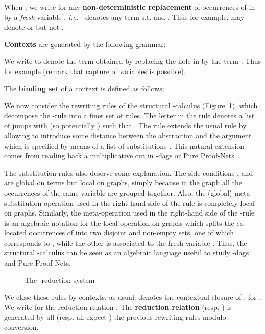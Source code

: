 \documentclass{LMCS}
\newcommand{\ie}{{\it  i.e.}~}
\renewcommand{\>}{\rightarrow}
\newcommand{\deft}[1]{{\bf #1}}
\begin{document}
When , we write  for any
\deft{non-deterministic replacement} of 
occurrences of  in  by a {\it fresh} variable , \ie\
 denotes  any term  s.t. 
 and . 
 Thus for
example,  may denote  or
 but not .

\deft{Contexts} are generated by the following grammar:

We write  to denote the term obtained by replacing the
hole  in  by the term . Thus for example  
 (remark that 
capture of variables is possible).

The  \deft{binding set} of a context 
is defined as follows: 
 


We now consider the
rewriting rules of the structural -calculus
(Figure~\ref{f:lambdaj}), which decompose the -rule into a
finer set of rules. The letter  in the rule 
  denotes a list  of jumps with
   (so potentially ) such that .  The  rule extends the usual  rule
   by allowing to introduce some
  distance between the abstraction  and the argument 
  which is specified by means of a list of substitutions
  . This natural extension comes from reading back a
  multiplicative cut in -dags or Pure
  Proof-Nets~\cite{AG09,AccattoliTh}.

The substitution
  rules also deserve some explanation. The side conditions ,
   and  are global on terms but local on graphs,
  simply because in the graph all the occurrences of the same variable are grouped
  together.  Also, the (global) meta-substitution
  operation  used in the right-hand side of the rule
   is completely local on graphs. Similarly, the meta-operation
   used in the right-hand side of the -rule is an
  algebraic notation for the local operation on graphs which splits  the co-located
  occurrences of  into two disjoint and
  non-empty sets, one of which corresponds  to , while the other is associated to
  the fresh variable . Thus, the structural
-calculus can be seen as an algebraic language useful to study
-dags and Pure Proof-Nets. 

\begin{figure}[ht]

\caption{The -reduction system}
\label{f:lambdaj}
\end{figure}



We close these rules by contexts, as usual:
 denotes the contextual closure of , for . We write  for the
reduction relation .  The \deft{reduction
  relation}  (resp.  ) is generated by all
(resp.  all expect ) the previous rewriting rules modulo
-conversion. \medskip
\end{document}
